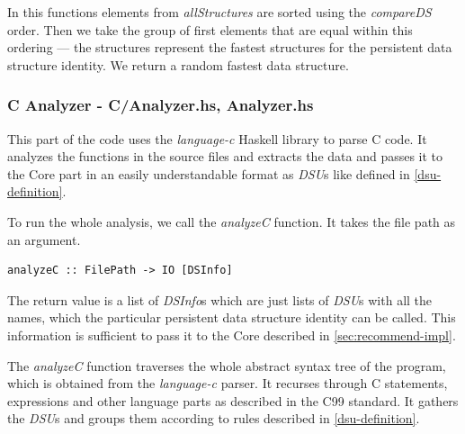 \documentclass[a4paper,11pt]{article}
\begin{document}
\begin{appendices}
		In this functions elements from \emph{allStructures} are sorted using the \emph{compareDS} order.
		Then we take the group of first elements that are equal within this ordering --- the structures
		represent the fastest structures for the persistent data structure identity. We return a random
		fastest data structure.
		
		\subsubsection{C Analyzer - C/Analyzer.hs, Analyzer.hs}
		This part of the code uses the \emph{language-c} Haskell library to parse C code. 
		It analyzes the functions in the source files and extracts the data and passes it
		to the Core part in an easily understandable format as \emph{DSU}s like defined in \autoref{dsu-definition}.

		To run the whole analysis, we call the \emph{analyzeC} function. It takes the file path as an argument.
\begin{verbatim}
analyzeC :: FilePath -> IO [DSInfo]
\end{verbatim}
		The return value is a list of \emph{DSInfo}s which are just lists of \emph{DSU}s with all the names, 
		which the particular persistent data structure identity can be called. This information is 
		sufficient to pass it to the Core described in \autoref{sec:recommend-impl}.

		The \emph{analyzeC} function traverses the whole abstract syntax tree of the program, which
		is obtained from the \emph{language-c} parser. It recurses through C statements, expressions 
		and other language parts as described in the C99 standard. It gathers the \emph{DSU}s and groups them
		according to rules described in \autoref{dsu-definition}.
				

\end{appendices}
\end{document}
